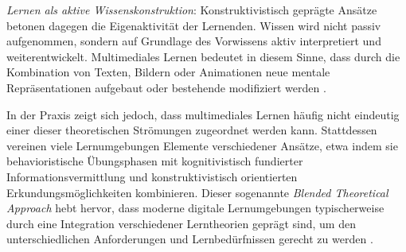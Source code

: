 \textit{Lernen als aktive Wissenskonstruktion}: Konstruktivistisch geprägte Ansätze betonen dagegen die Eigenaktivität der Lernenden. Wissen wird nicht passiv aufgenommen, sondern auf Grundlage des Vorwissens aktiv interpretiert und weiterentwickelt. Multimediales Lernen bedeutet in diesem Sinne, dass durch die Kombination von Texten, Bildern oder Animationen neue mentale Repräsentationen aufgebaut oder bestehende modifiziert werden \parencite[S.~64]{furstenau_lehr-lern-theorien_2019}.

In der Praxis zeigt sich jedoch, dass multimediales Lernen häufig nicht eindeutig einer dieser theoretischen Strömungen zugeordnet werden kann. Stattdessen vereinen viele Lernumgebungen Elemente verschiedener Ansätze, etwa indem sie behavioristische Übungsphasen mit kognitivistisch fundierter Informationsvermittlung und konstruktivistisch orientierten Erkundungsmöglichkeiten kombinieren. Dieser sogenannte \textit{Blended Theoretical Approach} hebt hervor, dass moderne digitale Lernumgebungen typischerweise durch eine Integration verschiedener Lerntheorien geprägt sind, um den unterschiedlichen Anforderungen und Lernbedürfnissen gerecht zu werden .
